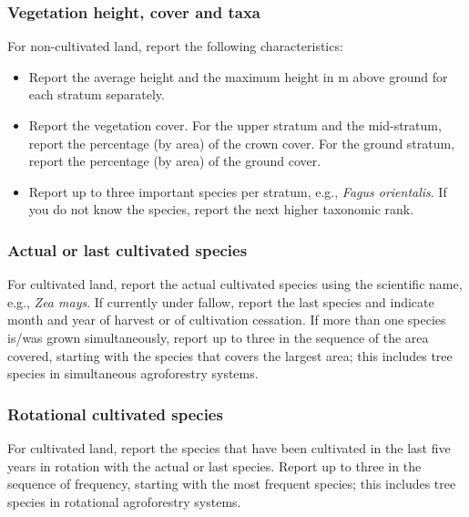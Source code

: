 \documentclass[
  letterpaper,
  DIV=11,
  numbers=noendperiod]{scrreprt}
\providecommand{\tightlist}{%
  \setlength{\itemsep}{0pt}\setlength{\parskip}{0pt}}\usepackage{longtable,booktabs,array}
\begin{document}
\hypertarget{vegetation-height-cover-and-taxa}{%
\subsubsection{Vegetation height, cover and
taxa}\label{vegetation-height-cover-and-taxa}}

For non-cultivated land, report the following characteristics:

\begin{itemize}
\tightlist
\item
  Report the average height and the maximum height in m above ground for
  each stratum separately.
\item
  Report the vegetation cover. For the upper stratum and the
  mid-stratum, report the percentage (by area) of the crown cover. For
  the ground stratum, report the percentage (by area) of the ground
  cover.
\item
  Report up to three important species per stratum, e.g., \emph{Fagus
  orientalis}. If you do not know the species, report the next higher
  taxonomic rank.
\end{itemize}

\hypertarget{actual-or-last-cultivated-species}{%
\subsubsection{Actual or last cultivated
species}\label{actual-or-last-cultivated-species}}

For cultivated land, report the actual cultivated species using the
scientific name, e.g., \emph{Zea mays}. If currently under fallow,
report the last species and indicate month and year of harvest or of
cultivation cessation. If more than one species is/was grown
simultaneously, report up to three in the sequence of the area covered,
starting with the species that covers the largest area; this includes
tree species in simultaneous agroforestry systems.

\hypertarget{rotational-cultivated-species}{%
\subsubsection{Rotational cultivated
species}\label{rotational-cultivated-species}}

For cultivated land, report the species that have been cultivated in the
last five years in rotation with the actual or last species. Report up
to three in the sequence of frequency, starting with the most frequent
species; this includes tree species in rotational agroforestry systems.
\end{document}
